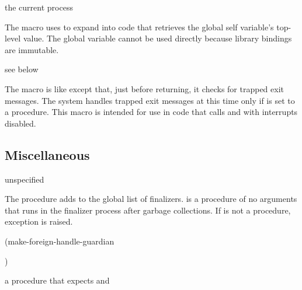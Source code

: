 \begin{syntax}
\end{syntax}
\returns{} the current process

The  macro uses  to expand into
code that retrieves the global self variable's top-level value. The
global variable cannot be used directly because library bindings are
immutable.

\begin{syntax}
\end{syntax}
\expandsto{} see below

The  macro is like
 except that, just before returning, it checks
for trapped exit messages.
The system handles trapped exit messages at this time only if
 is set to a procedure.
This macro is intended for use in code that calls  and
 with interrupts disabled.

\subsection{Miscellaneous}

\begin{procedure}
\end{procedure}
\returns{} unspecified

The  procedure adds
 to the global list of finalizers.  is a
procedure of no arguments that runs in the finalizer process after
garbage collections. If  is not a procedure, exception
 is raised.

\begin{procedure}
\codebegin
(make-foreign-handle-guardian   \strut
                                )\strut
\codeend
\end{procedure}
\returns{} a procedure that expects  and 

